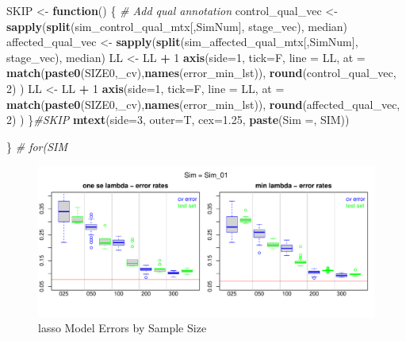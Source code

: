 \documentclass[
]{book}
\newenvironment{Shaded}{\begin{snugshade}}{\end{snugshade}}
\newcommand{\CommentTok}[1]{\textcolor[rgb]{0.56,0.35,0.01}{\textit{#1}}}
\newcommand{\ControlFlowTok}[1]{\textcolor[rgb]{0.13,0.29,0.53}{\textbf{#1}}}
\newcommand{\DataTypeTok}[1]{\textcolor[rgb]{0.13,0.29,0.53}{#1}}
\newcommand{\DecValTok}[1]{\textcolor[rgb]{0.00,0.00,0.81}{#1}}
\newcommand{\FloatTok}[1]{\textcolor[rgb]{0.00,0.00,0.81}{#1}}
\newcommand{\KeywordTok}[1]{\textcolor[rgb]{0.13,0.29,0.53}{\textbf{#1}}}
\newcommand{\NormalTok}[1]{#1}
\newcommand{\OperatorTok}[1]{\textcolor[rgb]{0.81,0.36,0.00}{\textbf{#1}}}
\newcommand{\StringTok}[1]{\textcolor[rgb]{0.31,0.60,0.02}{#1}}
\begin{document}
\begin{Shaded}
\begin{Highlighting}[]
\NormalTok{SKIP  <{-}}\StringTok{ }\ControlFlowTok{function}\NormalTok{() \{}
\CommentTok{\# Add qual annotation}
\NormalTok{control\_qual\_vec <{-}}\StringTok{ }\KeywordTok{sapply}\NormalTok{(}\KeywordTok{split}\NormalTok{(sim\_control\_qual\_mtx[,SimNum], stage\_vec), median)}
\NormalTok{affected\_qual\_vec <{-}}\StringTok{ }\KeywordTok{sapply}\NormalTok{(}\KeywordTok{split}\NormalTok{(sim\_affected\_qual\_mtx[,SimNum], stage\_vec), median)}
\NormalTok{LL <{-}}\StringTok{ }\NormalTok{LL }\OperatorTok{+}\StringTok{ }\DecValTok{1}
\KeywordTok{axis}\NormalTok{(}\DataTypeTok{side=}\DecValTok{1}\NormalTok{, }\DataTypeTok{tick=}\NormalTok{F, }\DataTypeTok{line =}\NormalTok{ LL,}
  \DataTypeTok{at =} \KeywordTok{match}\NormalTok{(}\KeywordTok{paste0}\NormalTok{(SIZE0,}\StringTok{\textquotesingle{}\_cv\textquotesingle{}}\NormalTok{),}\KeywordTok{names}\NormalTok{(error\_min\_lst)),}
  \KeywordTok{round}\NormalTok{(control\_qual\_vec, }\DecValTok{2}\NormalTok{)}
\NormalTok{ )}
\NormalTok{LL <{-}}\StringTok{ }\NormalTok{LL }\OperatorTok{+}\StringTok{ }\DecValTok{1}
\KeywordTok{axis}\NormalTok{(}\DataTypeTok{side=}\DecValTok{1}\NormalTok{, }\DataTypeTok{tick=}\NormalTok{F, }\DataTypeTok{line =}\NormalTok{ LL,}
  \DataTypeTok{at =} \KeywordTok{match}\NormalTok{(}\KeywordTok{paste0}\NormalTok{(SIZE0,}\StringTok{\textquotesingle{}\_cv\textquotesingle{}}\NormalTok{),}\KeywordTok{names}\NormalTok{(error\_min\_lst)),}
  \KeywordTok{round}\NormalTok{(affected\_qual\_vec, }\DecValTok{2}\NormalTok{)}
\NormalTok{ )}
\NormalTok{\}}\CommentTok{\#SKIP}
\KeywordTok{mtext}\NormalTok{(}\DataTypeTok{side=}\DecValTok{3}\NormalTok{, }\DataTypeTok{outer=}\NormalTok{T, }\DataTypeTok{cex=}\FloatTok{1.25}\NormalTok{, }\KeywordTok{paste}\NormalTok{(}\StringTok{\textquotesingle{}Sim =\textquotesingle{}}\NormalTok{,  SIM))}

\NormalTok{\} }\CommentTok{\# for(SIM}
\end{Highlighting}
\end{Shaded}

\begin{figure}
\centering
\includegraphics{Static/figures/lasso-simRes-errors-bySim-1.pdf}
\caption{\label{fig:lasso-simRes-errors-bySim}lasso Model Errors by Sample Size}
\end{figure}
\end{document}
